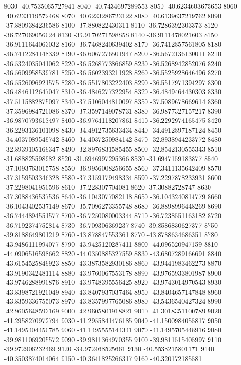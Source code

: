 {8030 -40.7535065727941
8040 -40.7434697289553
8050 -40.6234603675653
8060 -40.6233119572468
8070 -40.6233286723122
8080 -40.6139637219762
8090 -37.8809384236586
8100 -37.880822430311
8110 -36.7286392303373
8120 -36.727069056024
8130 -36.9170271598858
8140 -36.9111478021603
8150 -36.9111644063032
8160 -36.7468240639402
8170 -36.7412857561805
8180 -36.7412284148339
8190 -36.6067276501947
8200 -36.5672136130011
8210 -36.5324035041062
8220 -36.5268773866859
8230 -36.5268942852076
8240 -36.5609958539781
8250 -36.5602393211928
8260 -36.5525928646496
8270 -36.5526096921575
8280 -36.5517803222403
8290 -36.5517971394297
8300 -36.4846112647047
8310 -36.4846277322954
8320 -36.4849464430303
8330 -37.5115882875097
8340 -37.5106044810097
8350 -37.5089678669614
8360 -37.3596984720086
8370 -37.3597149078731
8380 -36.9877327157217
8390 -36.9870793613497
8400 -36.9764118207861
8410 -36.2292974165475
8420 -36.2293136101098
8430 -34.4912735633434
8440 -34.4912897187124
8450 -34.4037089549742
8460 -34.4037250984142
8470 -32.8938944233772
8480 -32.8939105169347
8490 -32.8976831585455
8500 -32.8542130555343
8510 -31.688825598982
8520 -31.6946997295366
8530 -31.6947159183877
8540 -37.1093763015758
8550 -36.9956008256655
8560 -37.3411135642409
8570 -37.3159503346328
8580 -37.3159179498334
8590 -37.2297878233931
8600 -37.2298041950596
8610 -37.228307704081
8620 -37.30882728747
8630 -37.3088436537536
8640 -36.1043077082118
8650 -36.1043240814779
8660 -36.1043402537149
8670 -35.7096273355748
8680 -36.8898996448269
8690 -36.7444894551577
8700 -36.7250080003344
8710 -36.7238551163182
8720 -36.7192374752814
8730 -36.709306369237
8740 -39.8586830627377
8750 -39.8188649801219
8760 -43.878847553361
8770 -43.8788634686351
8780 -43.9486111994077
8790 -43.9425120287411
8800 -44.096520947159
8810 -44.0906516598662
8820 -44.0350885327559
8830 -43.6807289166691
8840 -43.6154525849923
8850 -43.3873582930186
8860 -43.9441983462273
8870 -43.9190342481114
8880 -43.9760067553178
8890 -43.9765933801987
8900 -43.9746288990876
8910 -43.9748395556425
8920 -43.9743014970543
8930 -43.8398721920049
8940 -43.8407937037464
8950 -43.8404657147848
8960 -43.8359336755073
8970 -43.8357997765086
8980 -43.5436540427324
8990 -42.9605648593169
9000 -42.9605801918821
9010 -41.3018351100789
9020 -41.2958270972794
9030 -41.2955841476185
9040 -41.1500984055817
9050 -41.1495404450785
9060 -41.1495555144341
9070 -41.1495705448916
9080 -39.9811069205572
9090 -39.9811364970355
9100 -39.9811515405997
9110 -39.972906232469
9120 -39.972468525661
9130 -40.5538215801171
9140 -40.3503874014064
9150 -40.3641825266317
9160 -40.320172185581
}
